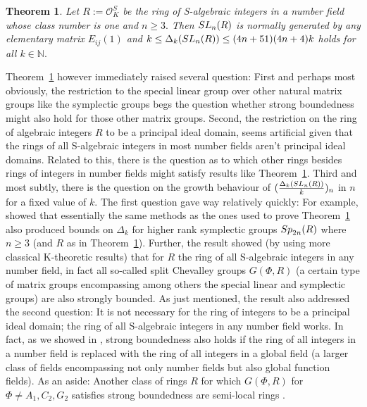 \documentclass[12pt]{amsart}
\newtheorem{theorem}{Theorem}[section]
\theoremstyle{definition}\newtheorem{definition}[theorem]{Definition}
\theoremstyle{remark}\newtheorem{remark}[theorem]{Remark}
\theoremstyle{definition}\newtheorem{case}{Case}
\begin{document}
\begin{theorem}\cite[Corollary~6.2]{KLM}\label{old_KLM_thm}
Let $R:=\mathscr{O}_K^S$ be the ring of S-algebraic integers in a number field whose class number is one and $n\geq 3.$ Then ${\rm SL}_n(R)$ is normally generated by any elementary matrix $E_{ij}(1)$ and $k\leq\Delta_k({\rm SL}_n(R))\leq (4n+51)(4n+4)k$ holds for all $k\in\mathbb{N}.$ 
\end{theorem}

Theorem~\ref{old_KLM_thm} however immediately raised several question: First and perhaps most obviously, the restriction to the special linear group over other natural matrix groups like the symplectic groups begs the question whether strong boundedness might also hold for those other matrix groups. Second, the restriction on the ring of algebraic integers $R$ to be a principal ideal domain, seems artificial given that the rings of all S-algebraic integers in most number fields aren't principal ideal domains. Related to this, there is the question as to which other rings besides rings of integers in number fields might satisfy results like Theorem~\ref{old_KLM_thm}. Third and most subtly, there is the question on the growth behaviour of $(\frac{\Delta_k({\rm SL}_n(R))}{k})_n$ in $n$ for a fixed value of $k.$ The first question gave way relatively quickly: For example, \cite[Theorem~3]{explicit_strong_bound_sp_2n} showed that essentially the same methods as the ones used to prove Theorem~\ref{old_KLM_thm} also produced bounds on $\Delta_k$ for higher rank symplectic groups ${\rm Sp}_{2n}(R)$ where $n\geq 3$ (and $R$ as in Theorem~\ref{old_KLM_thm}). Further, the result \cite[Theorem~5.13]{General_strong_bound} showed (by using more classical K-theoretic results) that for $R$ the ring of all S-algebraic integers in any number field, in fact all so-called split Chevalley groups $G(\Phi,R)$ (a certain type of matrix groups encompassing among others the special linear and symplectic groups) are also strongly bounded. 
As just mentioned, the result \cite[Theorem~5.13]{General_strong_bound} also addressed the second question: It is not necessary for the ring of integers to be a principal ideal domain; the ring of all S-algebraic integers in any number field works. In fact, as we showed in \cite[Theorem~1.5]{Chevalley_positive_char_tentative}, strong boundedness also holds if the ring of all integers in a number field is replaced with the ring of all integers in a global field (a larger class of fields encompassing not only number fields but also global function fields). As an aside: Another class of rings $R$ for which $G(\Phi,R)$ for $\Phi\neq A_1,C_2,G_2$ satisfies strong boundedness are semi-local rings \cite[Theorem~4.8]{General_strong_bound}.
\end{document}
